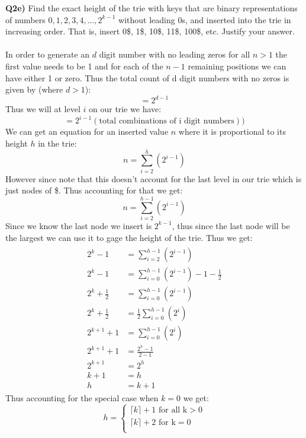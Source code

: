 \documentclass[12pt]{article}
\begin{document}
\begin{adjustwidth}{0em}{0pt}
\textbf{Q2e)} Find the exact height of the trie with keys that are binary representations of numbers $0, 1, 2, 3, 4, ..., 2^{k-1}$ without leading 0s, and inserted into the trie in increasing order. That is, insert 0\$, 1\$, 10\$, 11\$, 100\$, etc. Justify your answer. \\\\
In order to generate an $d$ digit number with no leading zeros for all $n > 1$ the first value needs to be 1 and for each of the $n-1$ remaining positions we can have either 1 or zero. Thus the total count of d digit numbers with no zeros is given by (where $d > 1$):
\[ = 2^{d-1} \]
Thus we will at level $i$ on our trie we have:
\[ = 2^{i-1} (\text{total combinations of i digit numbers})) \]
We can get an equation for an inserted value $n$ where it is proportional to its height $h$ in the trie:
\[ n = \sum^h_{i=2}(2^{i-1}) \]
However since note that this doesn't account for the last level in our trie which is just nodes of \$. Thus accounting for that we get:
\[ n = \sum^{h-1}_{i=2}(2^{i-1}) \]
Since we know the last node we insert is $2^{k-1}$, thus since the last node will be the largest we can use it to gage the height of the trie. Thus we get:
\begin{align*}  
    \begin{aligned}
       2^{k} -1 &= \sum^{h-1}_{i=2}(2^{i-1}) \\
       2^{k} -1  &= \sum^{h-1}_{i=0}(2^{i-1}) - 1 - \frac{1}{2}\\
       2^{k} + \frac{1}{2}  &= \sum^{h-1}_{i=0}(2^{i-1})\\
       2^{k} + \frac{1}{2}  &=\frac{1}{2}\sum^{h-1}_{i=0}(2^{i})\\
       2^{k+1} + 1 &= \sum^{h-1}_{i=0}(2^{i})\\
       2^{k+1} + 1 &= \frac{2^{h} - 1}{2-1}\\
       2^{k+1} &= 2^{h} \\
       k + 1 &= h \\
       h &= k + 1
    \end{aligned}
\end{align*}
Thus accounting for the special case when $k=0$ we get:
\[ h = \begin{cases}
\lceil k \rceil + 1 \text{ for all k} > 0\\
\lceil k \rceil + 2 \text{ for k} = 0\\
\end{cases} \]
\end{adjustwidth} 
\end{document}
